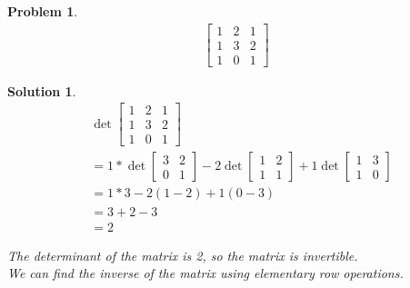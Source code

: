 \documentclass{article}
\newtheorem{problem}{Problem}
\newtheorem*{solution}{Solution}
\begin{document}
\begin{problem}
\begin{align*}
\begin{bmatrix}
1 & 2 & 1 \\ 1 & 3 & 2 \\ 1 & 0 & 1
\end{bmatrix}
\end{align*}
\end{problem}

\begin{solution}
\begin{align*}
& \det \begin{bmatrix}
1 & 2 & 1 \\ 1 & 3 & 2 \\ 1 & 0 & 1
\end{bmatrix} \\
&= 1 * \det \begin{bmatrix} 3 & 2 \\ 0 & 1 \end{bmatrix}  - 2 \det \begin{bmatrix} 1 & 2 \\ 1 & 1 \end{bmatrix} + 1 \det \begin{bmatrix} 1 & 3 \\ 1 & 0 \end{bmatrix} \\
&= 1 * 3 - 2(1-2) + 1(0-3) \\
&= 3 + 2 - 3 \\
&= 2
\end{align*}

The determinant of the matrix is 2, so the matrix is invertible. \\

We can find the inverse of the matrix using elementary row operations.


\end{solution}
\end{document}

